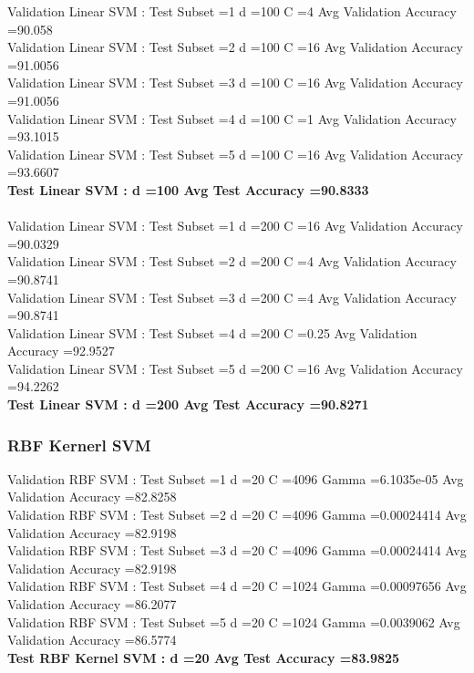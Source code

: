 \documentclass[paper=a4, fontsize=11pt]{scrartcl} %
\numberwithin{equation}{section} %
\numberwithin{figure}{section} %
\numberwithin{table}{section} %
\begin{document}
Validation Linear SVM : Test Subset =1 d =100 C =4 Avg Validation Accuracy =90.058\\
Validation Linear SVM : Test Subset =2 d =100 C =16 Avg Validation Accuracy =91.0056\\
Validation Linear SVM : Test Subset =3 d =100 C =16 Avg Validation Accuracy =91.0056\\
Validation Linear SVM : Test Subset =4 d =100 C =1 Avg Validation Accuracy =93.1015\\
Validation Linear SVM : Test Subset =5 d =100 C =16 Avg Validation Accuracy =93.6607\\
\textbf{Test Linear SVM : d =100 Avg Test Accuracy =90.8333}\\\\

Validation Linear SVM : Test Subset =1 d =200 C =16 Avg Validation Accuracy =90.0329\\
Validation Linear SVM : Test Subset =2 d =200 C =4 Avg Validation Accuracy =90.8741\\
Validation Linear SVM : Test Subset =3 d =200 C =4 Avg Validation Accuracy =90.8741\\
Validation Linear SVM : Test Subset =4 d =200 C =0.25 Avg Validation Accuracy =92.9527\\
Validation Linear SVM : Test Subset =5 d =200 C =16 Avg Validation Accuracy =94.2262\\
\textbf{Test Linear SVM : d =200 Avg Test Accuracy =90.8271}


\subsubsection{RBF Kernerl SVM}

Validation RBF SVM : Test Subset =1 d =20 C =4096 Gamma =6.1035e-05 Avg Validation Accuracy =82.8258\\
Validation RBF SVM : Test Subset =2 d =20 C =4096 Gamma =0.00024414 Avg Validation Accuracy =82.9198\\
Validation RBF SVM : Test Subset =3 d =20 C =4096 Gamma =0.00024414 Avg Validation Accuracy =82.9198\\
Validation RBF SVM : Test Subset =4 d =20 C =1024 Gamma =0.00097656 Avg Validation Accuracy =86.2077\\
Validation RBF SVM : Test Subset =5 d =20 C =1024 Gamma =0.0039062 Avg Validation Accuracy =86.5774\\
\textbf{Test RBF Kernel SVM : d =20 Avg Test Accuracy =83.9825}\\\\
\end{document}
